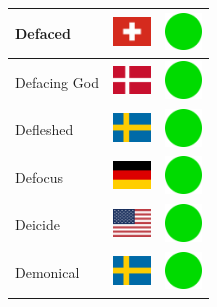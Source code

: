 \documentclass[12pt, a4paper, twoside]{report}
\begin{document}
\begin{center}
\begin{longtable}{|p{5cm}|p{2cm}|p{2cm}|}
 Defaced                                                    & \includegraphics[width=1cm]{../4x3/ch} &   \includegraphics[width=1cm]{../likes/y} \\ \hline
 Defacing God                                               & \includegraphics[width=1cm]{../4x3/dk} &   \includegraphics[width=1cm]{../likes/y} \\ \hline
 Defleshed                                                  & \includegraphics[width=1cm]{../4x3/se} &   \includegraphics[width=1cm]{../likes/y} \\ \hline
 Defocus                                                    & \includegraphics[width=1cm]{../4x3/de} &   \includegraphics[width=1cm]{../likes/y} \\ \hline
 Deicide                                                    & \includegraphics[width=1cm]{../4x3/us} &   \includegraphics[width=1cm]{../likes/y} \\ \hline
 Demonical                                                  & \includegraphics[width=1cm]{../4x3/se} &   \includegraphics[width=1cm]{../likes/y} \\ \hline

\end{longtable}
\end{center}
\end{document}
